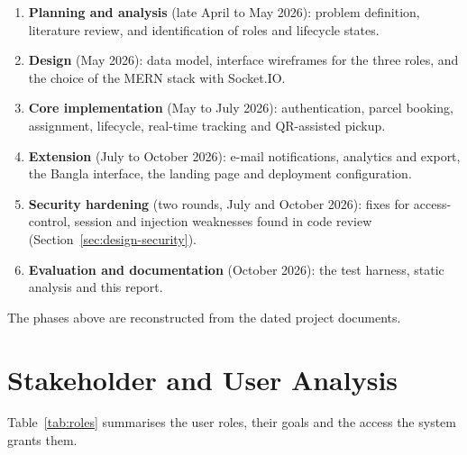 \begin{enumerate}
  \item \textbf{Planning and analysis} (late April to May 2026): problem definition, literature review, and identification of roles and lifecycle states.
  \item \textbf{Design} (May 2026): data model, interface wireframes for the three roles, and the choice of the MERN stack with Socket.IO.
  \item \textbf{Core implementation} (May to July 2026): authentication, parcel booking, assignment, lifecycle, real-time tracking and QR-assisted pickup.
  \item \textbf{Extension} (July to October 2026): e-mail notifications, analytics and export, the Bangla interface, the landing page and deployment configuration.
  \item \textbf{Security hardening} (two rounds, July and October 2026): fixes for access-control, session and injection weaknesses found in code review (Section~\ref{sec:design-security}).
  \item \textbf{Evaluation and documentation} (October 2026): the test harness, static analysis and this report.
\end{enumerate}

The phases above are reconstructed from the dated project documents.

\section{Stakeholder and User Analysis}
\label{sec:stakeholders}

Table~\ref{tab:roles} summarises the user roles, their goals and the access the system grants them.

